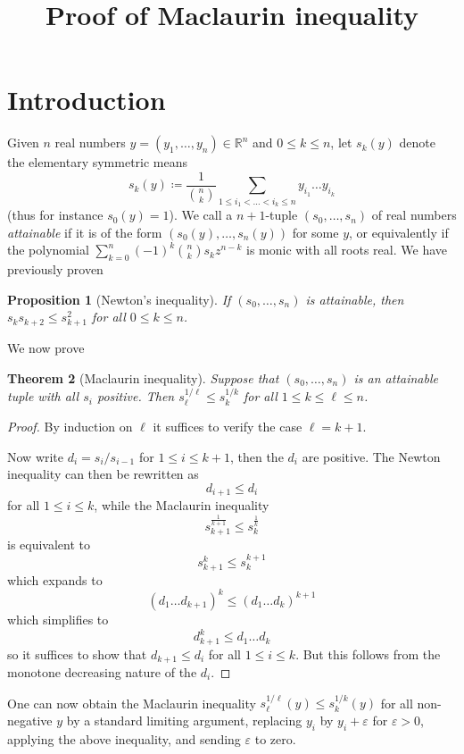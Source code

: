 \documentclass[12pt,a4paper,reqno]{amsart}
\numberwithin{equation}{section}
\theoremstyle{plain}
\newtheorem{theorem}{Theorem}[section]
\newtheorem{proposition}[theorem]{Proposition}
\theoremstyle{definition}
\newcommand\R{\mathbb{R}}
\newcommand\eps{\varepsilon}
\begin{document}
\title{Proof of Maclaurin inequality}

\author{} %
\address{}%
\email{}%



\maketitle


\section{Introduction}

Given $n$ real numbers $y = (y_1,\dots,y_n) \in \R^n$ and $0 \leq k \leq n$, let $s_k(y)$ denote the elementary symmetric means
$$ s_k(y) \coloneqq \frac{1}{\binom{n}{k}} \sum_{1 \leq i_1 < \dots < i_k \leq n} y_{i_1} \dots y_{i_k}$$
(thus for instance $s_0(y)=1$).  
We call a $n+1$-tuple $(s_0,\dots,s_n)$ of real numbers \emph{attainable} if it is of the form $(s_0(y),\dots,s_n(y))$ for some $y$, or equivalently if the polynomial $\sum_{k=0}^n (-1)^k \binom{n}{k} s_k z^{n-k}$ is monic with all roots real.  We have previously proven



\begin{proposition}[Newton's inequality]\label{prop-newton} If $(s_0,\dots,s_n)$ is attainable, then $s_k s_{k+2} \leq s_{k+1}^2$ for all $0 \leq k \leq n$.
\end{proposition}

We now prove

\begin{theorem}[Maclaurin inequality]\label{thm-maclaurin}  Suppose that $(s_0,\dots,s_n)$ is an attainable tuple with all $s_i$ positive.  Then $s_\ell^{1/\ell} \leq s_k^{1/k}$ for all $1 \leq k \leq \ell \leq n$.
\end{theorem}

\begin{proof}  By induction on $\ell$ it suffices to verify the case $\ell=k+1$.

Now write $d_i = s_i / s_{i-1}$ for $1 \leq i \leq k+1$, then the $d_i$ are positive.  The Newton inequality can then be rewritten as
$$ d_{i+1} \leq d_i$$
for all $1 \leq i \leq k$, while the Maclaurin inequality
$$ s_{k+1}^{\frac{1}{k+1}} \leq s_k^{\frac{1}{k}}$$
is equivalent to
$$ s_{k+1}^k \leq s_k^{k+1}$$
which expands to
$$ (d_1 \dots d_{k+1})^k \leq (d_1 \dots d_k)^{k+1}$$
which simplifies to
$$ d_{k+1}^k \leq d_1 \dots d_k$$
so it suffices to show that $d_{k+1} \leq d_i$ for all $1 \leq i \leq k$.  But this follows from the monotone decreasing nature of the $d_i$.
\end{proof}

One can now obtain the Maclaurin inequality
$s_\ell^{1/\ell}(y) \leq s_k^{1/k}(y)$ for all non-negative $y$ by a standard limiting argument, replacing $y_i$ by $y_i+\eps$ for $\eps>0$, applying the above inequality, and sending $\eps$ to zero.
\end{document}
